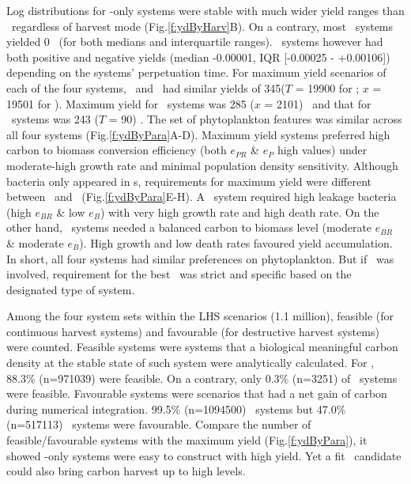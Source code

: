 \documentclass[../thesis.tex]{subfiles} %
\begin{document}
Log distributions for \phy-only systems were stable with much wider yield ranges than \pbs\ regardless of harvest mode (Fig.\ref{f:ydByHarv}B).  On a contrary, most \PBH\ systems yielded 0 \dxdt\ (for both medians and interquartile ranges).  \PBN\ systems however had both positive and negative yields (median -0.00001, IQR [-0.00025 - +0.00106]\dxdt) depending on the systems' perpetuation time.  For maximum yield scenarios of each of the four systems, \PoH\ and \PoN\ had similar yields of 345\dxdt ($T$ = 19900 for \PoN; $x$ = 19501 for \PoH).  Maximum yield for \PBH\ systems was 285 ($x$ = 2101) \dxdt\ and that for \PBN\ systems was 243 ($T$ = 90) \dxdt.  The set of phytoplankton features was similar across all four systems (Fig.\ref{f:ydByPara}A-D).  Maximum yield systems preferred high carbon to biomass conversion efficiency (both $e_{PR}$ \& $e_P$ high values) under moderate-high growth rate and minimal population density sensitivity.  Although bacteria only appeared in \pbs s, requirements for maximum yield were different between \PBN\ and \PBH\ (Fig.\ref{f:ydByPara}E-H).  A \PBN\ system required high leakage bacteria (high $e_{BR}$ \& low $e_B$) with very high growth rate and high death rate.  On the other hand, \PBH\ systems needed a balanced carbon to biomass level (moderate $e_{BR}$ \& moderate $e_B$).  High growth and low death rates favoured yield accumulation.  In short, all four systems had similar preferences on phytoplankton.  But if \bac\ was involved, requirement for the best \bac\ was strict and specific based on the designated type of system.

Among the four system sets within the LHS scenarios (1.1 million), feasible (for continuous harvest systems) and favourable (for destructive harvest systems) were counted.  Feasible systems were systems that a biological meaningful carbon density at the stable state of such system were analytically calculated.  For \PoH, 88.3\% (n=971039) were feasible.  On a contrary, only 0.3\% (n=3251) of \PBH\ systems were feasible.  Favourable systems were scenarios that had a net gain of carbon during numerical integration.  99.5\% (n=1094500) \PoN\ systems but 47.0\% (n=517113) \PBN\ systems were favourable.  Compare the number of feasible/favourable systems with the maximum yield (Fig.\ref{f:ydByPara}), it showed \phy-only systems were easy to construct with high yield.  Yet a fit \bac\ candidate could also bring carbon harvest up to high levels.
\end{document}
